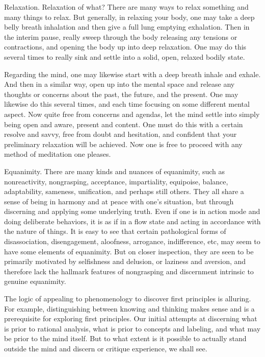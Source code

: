 \documentclass[12pt,openany]{book}
\begin{document}
Relaxation. Relaxation of what? There are many ways to relax something and many things to relax. But generally, in relaxing your body, one may take a deep belly breath inhalation and then give a full lung emptying exhalation. Then in the interim pause, really sweep through the body releasing any tensions or contractions, and opening the body up into deep relaxation. One may do this several times to really sink and settle into a solid, open, relaxed bodily state. 

Regarding the mind, one may likewise start with a deep breath inhale and exhale. And then in a similar way, open up into the mental space and release any thoughts or concerns about the past, the future, and the present. One may likewise do this several times, and each time focusing on some different mental aspect. Now quite free from concerns and agendas, let the mind settle into simply being open and aware, present and content. One must do this with a certain resolve and savvy, free from doubt and hesitation, and confident that your preliminary relaxation will be achieved. Now one is free to proceed with any method of meditation one pleases.  

Equanimity. There are many kinds and nuances of equanimity, such as nonreactivity, nongrasping, acceptance, impartiality, equi\-poise, balance, adaptability, sameness, unification, and perhaps still others. They all share a sense of being in harmony and at peace with one’s situation, but through discerning and applying some underlying truth. Even if one is in action mode and doing deliberate behaviors, it is as if in a flow state and acting in accordance with the nature of things. It is easy to see that certain pathological forms of disassociation, disengagement, aloofness, arrogance, indifference, etc, may seem to have some elements of equanimity. But on closer inspection, they are seen to be primarily motivated by selfishness and delusion, or laziness and aversion, and therefore lack the hallmark features of nongrasping and discernment intrinsic to genuine equanimity.

The logic of appealing to phenomenology to discover first principles is alluring. For example, distinguishing between knowing and thinking makes sense and is a prerequisite for exploring first principles. Our initial attempts at discerning what is prior to rational analysis, what is prior to concepts and labeling, and what may be prior to the mind itself. But to what extent is it possible to actually stand outside the mind and discern or critique experience, we shall see.
 
\end{document}
